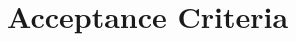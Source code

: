   \section*{Acceptance Criteria}


  \pagebreak
\vspace{36pt}
 \newcommand*\justify{%
   \fontdimen2\font=0.4em%
   \fontdimen3\font=0.2em%
   \fontdimen4\font=0.1em%
   \fontdimen7\font=0.1em%
  \hyphenchar\font=`\-%
  }

%
%
%
%
%
